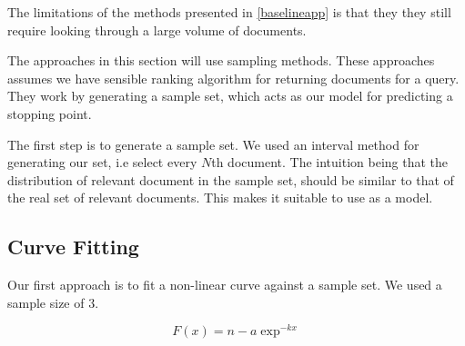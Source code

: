 The limitations of the methods presented in \ref{baselineapp} is that they they still require looking through a large volume of documents.

The approaches in this section will use sampling methods. These approaches assumes we have sensible ranking algorithm for returning documents for a query. They work by generating a sample set, which acts as our model for predicting a stopping point.

The first step is to generate a sample set. We used an interval method for generating our set, i.e select every $N$th document. The intuition being that the distribution of relevant document in the sample set, should be similar to that of the real set of relevant documents. This makes it suitable to use as a model. 

\subsection{Curve Fitting}

Our first approach is to fit a non-linear curve against a sample set. We used a sample size of 3.

\begin{equation}
F(x) = n - a\exp^{-kx}
\end{equation}

